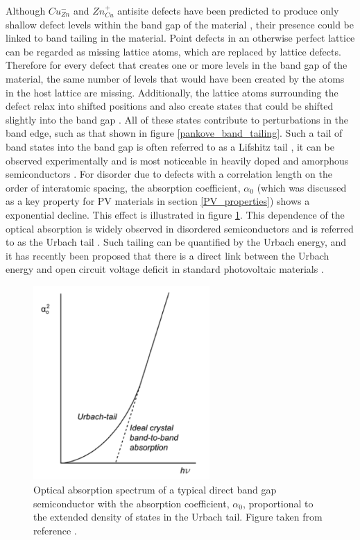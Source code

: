 Although $Cu_{Zn}^{-}$ and $Zn_{Cu}^{+}$ antisite defects have been predicted to produce only shallow defect levels within the band gap of the material \cite{defect1}, their presence could be linked to band tailing in the material. 
Point defects in an otherwise perfect lattice can be regarded as missing lattice atoms, which are replaced by lattice defects. Therefore for every defect that creates one or more levels in the band gap of the material, the same number of levels that would have been created by the atoms in the host lattice are missing. Additionally, the lattice atoms surrounding the defect relax into shifted positions and also create states that could be shifted slightly into the band gap \cite{thin_film_Boer}. All of these states contribute to perturbations in the band edge, such as that shown in figure \ref{pankove_band_tailing}. Such a tail of band states into the band gap is often referred to as a Lifshitz tail \cite{Lifshitz1964}, it can be observed experimentally and is most noticeable in heavily doped and amorphous semiconductors \cite{thin_film_Boer}. For disorder due to defects with a correlation length on the order of interatomic spacing, the absorption coefficient, $\alpha_{0}$ (which was discussed as a key property for PV materials in section \ref{PV_properties}) shows a exponential decline. This effect is illustrated in figure \ref{urbach_fig}. This dependence of the optical absorption is widely observed in disordered semiconductors \cite{thin_film_Boer} and is referred to as the Urbach tail \cite{Urbach1953}. Such tailing can be quantified by the Urbach energy, and it has recently been proposed that there is a direct link between the Urbach energy and open circuit voltage deficit in standard photovoltaic materials \cite{culprit, UrbachE_Voc}.

\begin{figure}[h!]
  \centering
    \includegraphics[width=0.6\textwidth]{figures/urbach_fig.png}
    \caption{Optical absorption spectrum of a typical direct band gap semiconductor with the absorption coefficient, $\alpha_{0}$, proportional to the extended density of states in the Urbach tail. Figure taken from reference .}
  \label{urbach_fig}
\end{figure}


